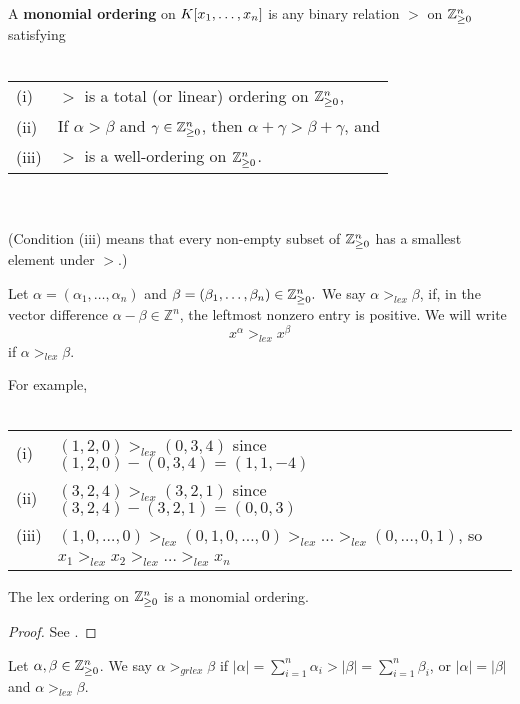 \documentclass[english,bachelor]{liumaiex}
\begin{document}
\begin{define}
A \textbf{monomial ordering} on $K[x_1,\dots, x_n]$ is any binary relation $>$ on $\mathbb{Z}_{\geq 0}^n$ satisfying \\ \\
\begin{tabular}{l l}
(i) & $>$ is a total (or linear) ordering on $\mathbb{Z}_{\geq 0}^n$, \\
(ii) & If $\alpha>\beta$ and $\gamma \in \mathbb{Z}_{\geq 0}^n$, then $\alpha+\gamma>\beta+\gamma$, and \\
(iii) & $>$ is a well-ordering on $\mathbb{Z}_{\geq 0}^n$.
\end{tabular}
\\ \\
(Condition (iii) means that every non-empty subset of $\mathbb{Z}_{\geq 0}^n$ has a smallest element under $>$.)
\end{define}

\begin{define}
Let $\alpha=(\alpha_1,\dots,\alpha_n)$ and $\beta=(\beta_1,\dots,\beta_n)\in\mathbb{Z}_{\geq 0}^n.$ We say $\alpha>_{lex} \beta$, if, in the vector difference $\alpha - \beta \in \mathbb{Z}^n$, the leftmost nonzero entry is positive. We will write
\begin{displaymath}
x^\alpha >_{lex} x^\beta
\end{displaymath}
if $\alpha >_{lex} \beta$.
\end{define}
For example,\\ \\
\begin{tabular}{l l}
(i) & $(1,2,0)>_{lex}(0,3,4)$ since $(1,2,0)-(0,3,4)=(1,1,-4)$\\
(ii) & $(3,2,4)>_{lex}(3,2,1)$ since $(3,2,4)-(3,2,1)=(0,0,3)$\\
(iii) & $(1,0,\dots,0)>_{lex}(0,1,0,\dots,0)>_{lex}\dots>_{lex}(0,\dots,0,1)$, so\\
 & $x_1>_{lex}x_2>_{lex}\dots>_{lex}x_n$ \\
\end{tabular}

\begin{prop}
The lex ordering on $\mathbb{Z}_{\geq 0}^n$ is a monomial ordering.
\end{prop}
\begin{proof}
See \cite[p. 57]{cox}.
\end{proof}

\begin{define}
Let $\alpha, \beta \in \mathbb{Z}_{\geq 0}^n$. We say $\alpha>_{grlex}\beta$ if $\lvert\alpha\rvert=\sum_{i=1}^{n}\alpha_i > \lvert\beta\rvert=\sum_{i=1}^{n}\beta_i$, or $\lvert\alpha\rvert=\lvert\beta\rvert$ and $\alpha >_{lex} \beta$.
\end{define}
\end{document}
